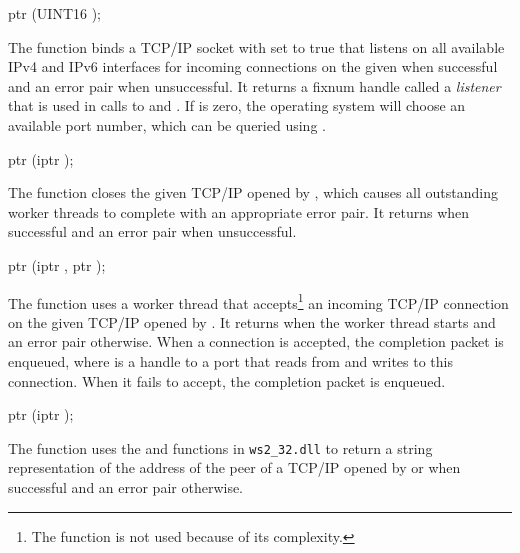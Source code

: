 \begin{function}
  ptr (UINT16 );
\end{function}\antipar

The  function binds a TCP/IP socket with
 set to true that listens on all
available IPv4 and IPv6 interfaces for incoming connections on the
given  when successful and an error pair when
unsuccessful. It returns a fixnum handle called a \emph{listener} that
is used in calls to  and
. If  is zero, the operating
system will choose an available port number, which can be queried
using .

\begin{function}
  ptr (iptr );
\end{function}\antipar

The  function closes the given TCP/IP
 opened by , which causes all
outstanding  worker threads to complete with an
appropriate error pair. It returns  when successful and an
error pair when unsuccessful.

\begin{function}
  ptr (iptr , ptr );
\end{function}\antipar

The  function uses a worker thread that
accepts\footnote{The  function is not used because of
  its complexity.} an incoming TCP/IP connection on the given TCP/IP
 opened by . It returns
 when the worker thread starts and an error pair
otherwise. When a connection is accepted, the completion packet
 is enqueued, where  is
a handle to a port that reads from and writes to this connection. When
it fails to accept, the completion packet  is enqueued.

\begin{function}
  ptr (iptr );
\end{function}\antipar

The  function uses the 
and  functions in \texttt{ws2\_32.dll} to
return a string representation of the address of the peer of a TCP/IP
 opened by  or
 when successful and an error pair otherwise.


